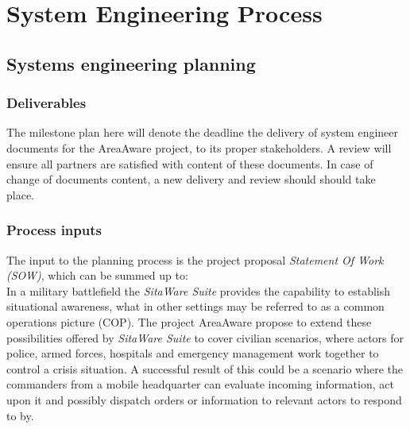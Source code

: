 %
\thispagestyle{fancy}
\chapter{System Engineering Process}
\label{chp:se_process}

\section{Systems engineering planning}

\subsection{Deliverables}
\label{plan:deliverables}
The milestone plan here will denote the deadline the delivery of system engineer documents for the AreaAware project, to its proper stakeholders.
A review will ensure all partners are satisfied with content of these documents.
In case of change of documents content, a new delivery and review should should take place.

\subsection{Process inputs}
The input to the planning process is the project proposal \emph{Statement Of Work (SOW)}, which can be summed up to: \\
In a military battlefield the \emph{SitaWare Suite} provides the capability to establish situational awareness, what in other settings may be referred to as a common operations picture (COP).
The project AreaAware propose to extend these possibilities offered by \emph{SitaWare Suite} to cover civilian scenarios, where actors for police, armed forces, hospitals and emergency management work together to control a crisis situation.
A successful result of this could be a scenario where the commanders from a mobile headquarter can evaluate incoming information, act upon it and possibly dispatch orders or information to relevant actors to respond to by.

